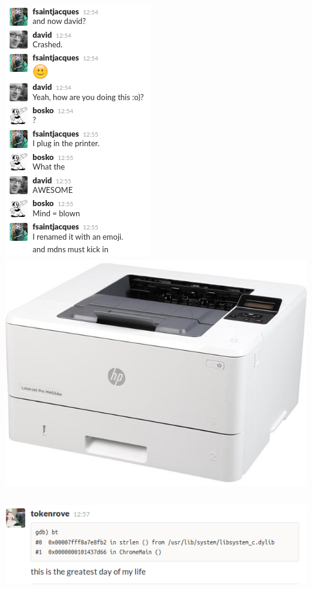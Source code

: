 \documentclass[aspectratio=169]{beamer}
\begin{document}
\begin{frame}
  \begin{columns}[t]
    \centering
    \includegraphics[scale=0.5]{04-plugged-in-the-printer}
    \centering
    \includegraphics[scale=0.25]{hp-m402dw}
  \end{columns}
\end{frame}

\begin{frame}
  \begin{center}
    \includegraphics[scale=0.5]{greatest-day}
  \end{center}
\end{frame}
\end{document}
